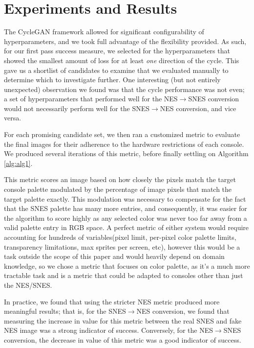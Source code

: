 \documentclass[10pt,twocolumn,letterpaper]{article}
\begin{document}
\section{Experiments and Results}


The CycleGAN framework allowed for significant configurability of hyperparameters, and we took full advantage of the flexibility provided. As such, for our first pass success measure, we selected for the hyperparameters that showed the smallest amount of loss for at least \textit{one} direction of the cycle. This gave us a shortlist of candidates to examine that we evaluated manually to determine which to investigate further. One interesting (but not entirely unexpected) observation we found was that the cycle performance was not even; a set of hyperparameters that performed well for the NES$\rightarrow$SNES conversion would not necessarily perform well for the SNES$\rightarrow$NES conversion, and vice versa.

For each promising candidate set, we then ran a customized metric to evaluate the final images for their adherence to the hardware restrictions of each console. We produced several iterations of this metric, before finally settling on Algorithm \ref{alg:alg1}.

This metric scores an image based on how closely the pixels match the target console palette modulated by the percentage of image pixels that match the target palette exactly. This modulation was necessary to compensate for the fact that the SNES palette has many more entries, and consequently, it was easier for the algorithm to score highly as any selected color was never too far away from a valid palette entry in RGB space. A perfect metric of either system would require accounting for hundreds of variables(pixel limit, per-pixel color palette limits, transparency limitations, max sprites per screen, etc), however this would be a task outside the scope of this paper and would heavily depend on domain knowledge, so we chose a metric that focuses on color palette, as it's a much more tractable task and is a metric that could be adapted to consoles other than just the NES/SNES.

In practice, we found that using the stricter NES metric produced more meaningful results; that is, for the SNES$\rightarrow$NES conversion, we found that measuring the increase in value for this metric between the real SNES and fake NES image was a strong indicator of success. Conversely, for the NES$\rightarrow$SNES conversion, the decrease in value of this metric was a good indicator of success.
\end{document}
